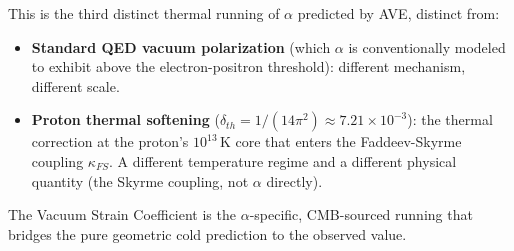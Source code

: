 This is the third distinct thermal running of $\alpha$ predicted by AVE, distinct from:
\begin{itemize}
    \item \textbf{Standard QED vacuum polarization} (which $\alpha$ is conventionally modeled to exhibit above the electron-positron threshold): different mechanism, different scale.
    \item \textbf{Proton thermal softening} ($\delta_{th} = 1/(14\pi^2) \approx 7.21\times 10^{-3}$): the thermal correction at the proton's $10^{13}$\,K core that enters the Faddeev-Skyrme coupling $\kappa_{FS}$. A different temperature regime and a different physical quantity (the Skyrme coupling, not $\alpha$ directly).
\end{itemize}

The Vacuum Strain Coefficient is the $\alpha$-specific, CMB-sourced running that bridges the pure geometric cold prediction to the observed value.
